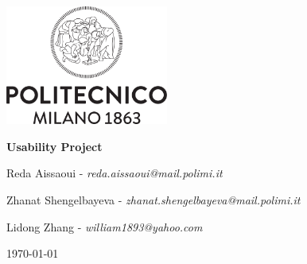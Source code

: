 \begin{titlepage}
\centering
\includegraphics[width=0.40\textwidth]{Design/resources/other/logo.png}\par
\vspace{1.5cm}
{\LARGE \textbf{Usability Project} \par}
\vspace{0.2cm}
{\large {}\par}
\vspace{1.0cm}
{\large Reda Aissaoui - \textit{reda.aissaoui@mail.polimi.it} \par}
{\large Zhanat Shengelbayeva - \textit{zhanat.shengelbayeva@mail.polimi.it} \par}
{\large Lidong Zhang  - \textit{william1893@yahoo.com} \par}
\vspace{6cm}

\vfill
{\large \today \par}
\end{titlepage}
